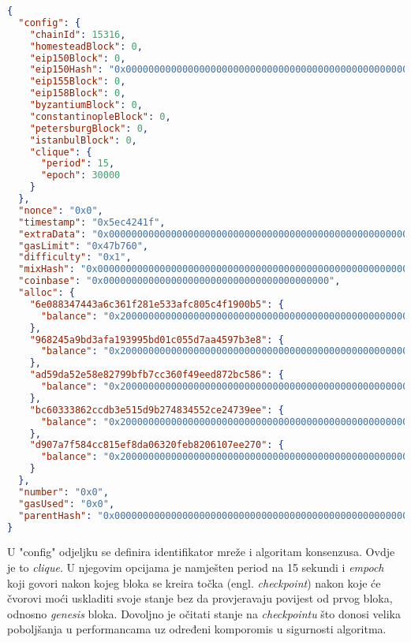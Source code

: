 \documentclass[times, utf8, zavrsni]{fer}
\begin{document}
\begin{lstlisting}[language=json,firstnumber=1]
    {
  "config": {
    "chainId": 15316,
    "homesteadBlock": 0,
    "eip150Block": 0,
    "eip150Hash": "0x0000000000000000000000000000000000000000000000000000000000000000",
    "eip155Block": 0,
    "eip158Block": 0,
    "byzantiumBlock": 0,
    "constantinopleBlock": 0,
    "petersburgBlock": 0,
    "istanbulBlock": 0,
    "clique": {
      "period": 15,
      "epoch": 30000
    }
  },
  "nonce": "0x0",
  "timestamp": "0x5ec4241f",
  "extraData": "0x00000000000000000000000000000000000000000000000000000000000000006e088347443a6c361f281e533afc805c4f1900b5968245a9bd3afa193995bd01c055d7aa4597b3e8ad59da52e58e82799bfb7cc360f49eed872bc586bc60333862ccdb3e515d9b274834552ce24739eed907a7f584cc815ef8da06320feb8206107ee2700000000000000000000000000000000000000000000000000000000000000000000000000000000000000000000000000000000000000000000000000000000000",
  "gasLimit": "0x47b760",
  "difficulty": "0x1",
  "mixHash": "0x0000000000000000000000000000000000000000000000000000000000000000",
  "coinbase": "0x0000000000000000000000000000000000000000",
  "alloc": {
    "6e088347443a6c361f281e533afc805c4f1900b5": {
      "balance": "0x200000000000000000000000000000000000000000000000000000000000000"
    },
    "968245a9bd3afa193995bd01c055d7aa4597b3e8": {
      "balance": "0x200000000000000000000000000000000000000000000000000000000000000"
    },
    "ad59da52e58e82799bfb7cc360f49eed872bc586": {
      "balance": "0x200000000000000000000000000000000000000000000000000000000000000"
    },
    "bc60333862ccdb3e515d9b274834552ce24739ee": {
      "balance": "0x200000000000000000000000000000000000000000000000000000000000000"
    },
    "d907a7f584cc815ef8da06320feb8206107ee270": {
      "balance": "0x200000000000000000000000000000000000000000000000000000000000000"
    }
  },
  "number": "0x0",
  "gasUsed": "0x0",
  "parentHash": "0x0000000000000000000000000000000000000000000000000000000000000000"
}
\end{lstlisting}

U "config" odjeljku se definira identifikator mreže i algoritam konsenzusa. Ovdje je to \emph{clique}. U njegovim opcijama je namješten
period na 15 sekundi i \emph{empoch} koji govori nakon kojeg bloka se kreira točka (engl. \emph{checkpoint}) nakon koje će čvorovi moći
uskladiti svoje stanje bez da provjeravaju povijest od prvog bloka, odnosno \emph{genesis} bloka. Dovoljno je očitati stanje na \emph{checkpointu}
što donosi velika poboljšanja u performancama uz određeni komporomis u sigurnosti algoritma.
\end{document}
